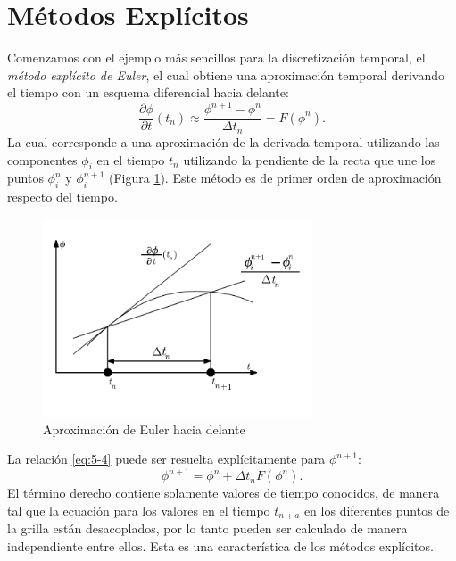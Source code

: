 \documentclass[a4paper,10pt, oneside]{book}
\begin{document}
\section{Métodos Explícitos}

Comenzamos con el ejemplo más sencillos para la discretización temporal, el \textit{método explícito de Euler}, el cual obtiene una aproximación temporal derivando el tiempo con un esquema diferencial hacia delante:
\begin{equation}
	\frac{\partial \phi}{\partial t}(t_n) \approx \frac{\phi^{n+1} - \phi^n}{\Delta t_n} = F(\phi^n).
	\label{eq:5-4}
\end{equation}
La cual corresponde a una aproximación de la derivada temporal utilizando las componentes $\phi_i$ en el tiempo $t_n$ utilizando la pendiente de la recta que une los puntos $\phi_i^n$ y $\phi_i^{n+1}$ (Figura \ref{img:5-5}). Este método es de primer orden de aproximación respecto del tiempo.
\begin{figure}[h!]
	\centering
	\includegraphics[width=8cm]{Img/5-5}
	\caption{Aproximación de Euler hacia delante}
	\label{img:5-5}
\end{figure}

La relación \ref{eq:5-4} puede ser resuelta explícitamente para $\phi^{n+1}$:
\begin{equation}
	\phi^{n+1} = \phi^n + \Delta t_n F(\phi^n). \nonumber
\end{equation}
El término derecho contiene solamente valores de tiempo conocidos, de manera tal que la ecuación para los valores en el tiempo $t_{n+a}$ en los diferentes puntos de la grilla están desacoplados, por lo tanto pueden ser calculado de manera independiente entre ellos. Esta es una característica de los métodos explícitos.
\end{document}
